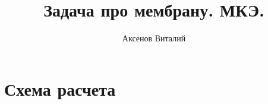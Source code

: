 \documentclass[12pt,a4paper,fleqn]{article}
\title{Задача про мембрану. МКЭ.}
\author{Аксенов Виталий}
\begin{document}
\maketitle
\thispagestyle{empty}

\newcommand{\MM}{\mathbf{M}}
\newcommand{\KM}{\mathbf{K}}
\newcommand{\fM}{\mathbf{f}}
\newcommand{\aM}{\mathbf{a}}
\newcommand{\NM}{\mathbf{N}}
\newcommand{\BM}{\mathbf{B}}
\newcommand{\DM}{\mathbf{D}}



\section*{Схема расчета}
\end{document}
